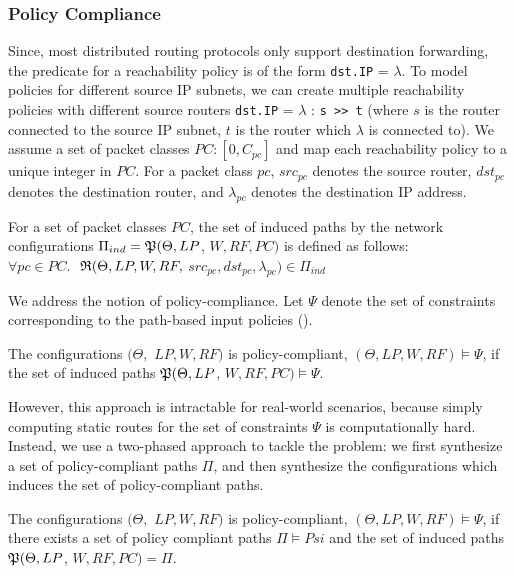 \subsubsection{Policy Compliance}
Since, most distributed routing protocols only support
destination forwarding, the predicate for a reachability
policy is of the form \texttt{dst.IP} = $\lambda$. To 
model policies for different source IP subnets, we can create
multiple reachability policies with different source routers
\texttt{dst.IP} = $\lambda$ : \texttt{s >> t} (where $s$ is
the router connected to the source IP subnet, $t$ is the router
which $\lambda$ is connected to).
We assume a set of packet classes $PC : [0,C_{pc}]$ 
and map each reachability policy to a unique integer in $PC$.
For a packet class $pc$, $src_{pc}$ denotes the source router,
$dst_{pc}$ denotes the destination router, and $\lambda_{pc}$
denotes the destination IP address. 

\begin{definition}
For a set of packet classes $PC$, the set of induced
paths by the network configurations $\Pi_{ind} = \mathfrak{P}(\Theta, LP$, 
$W, RF, PC)$ is defined as follows: \\
$\forall pc \in PC.$
$~\mathfrak{R}(\Theta, LP, W, RF,$ $src_{pc}, dst_{pc}, \lambda_{pc}) \in \Pi_{ind} $
\end{definition}

\noindent We address the notion of policy-compliance. Let 
$\Psi$ denote the set of constraints corresponding to the 
path-based input policies (). 
\begin{definition}
	The configurations $(\Theta,$ $LP, W, RF)$ is policy-compliant,
	$(\Theta, LP, W, RF) \models \Psi$, if the set of
	induced paths $\mathfrak{P}(\Theta, LP$, $W, RF, PC) \models \Psi$.
\end{definition}

However, this approach is intractable for real-world scenarios,
because simply computing static routes for the set of constraints 
$\Psi$ is computationally hard. Instead, we use a two-phased approach
to tackle the problem: we first synthesize a set of policy-compliant
paths $\Pi$, and then synthesize the configurations which induces
the set of policy-compliant paths. 
\begin{definition}
	The configurations $(\Theta,$ $LP, W, RF)$ is policy-compliant,
	$(\Theta, LP, W, RF) \models \Psi$, if there exists a set of
	policy compliant paths $\Pi \models Psi$ and the set of
	induced paths $\mathfrak{P}(\Theta, LP$, $W, RF, PC) = \Pi$.
\end{definition}

